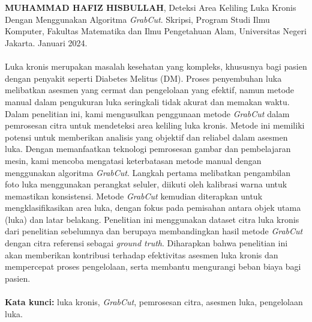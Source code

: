 \chapter*{}
\singlespacing{}

\textbf{MUHAMMAD HAFIZ HISBULLAH}, Deteksi Area Keliling Luka Kronis Dengan 
Menggunakan Algoritma \emph{GrabCut}. Skripsi, Program Studi Ilmu Komputer, Fakultas Matematika dan Ilmu Pengetahuan Alam, Universitas Negeri Jakarta. Januari 2024.
\\
\\

Luka kronis merupakan masalah kesehatan yang kompleks, khususnya bagi pasien dengan 
penyakit seperti Diabetes Melitus (DM). Proses penyembuhan luka melibatkan asesmen 
yang cermat dan pengelolaan yang efektif, namun metode manual dalam pengukuran 
luka seringkali tidak akurat dan memakan waktu. Dalam penelitian ini, kami mengusulkan 
penggunaan metode \emph{GrabCut} dalam pemrosesan citra untuk mendeteksi area keliling 
luka kronis. Metode ini memiliki potensi untuk memberikan analisis yang objektif 
dan reliabel dalam asesmen luka. Dengan memanfaatkan teknologi pemrosesan gambar dan pembelajaran mesin, kami mencoba 
mengatasi keterbatasan metode manual dengan menggunakan algoritma \emph{GrabCut}. Langkah 
pertama melibatkan pengambilan foto luka menggunakan perangkat seluler, diikuti 
oleh kalibrasi warna untuk memastikan konsistensi. Metode \emph{GrabCut} kemudian diterapkan 
untuk mengklasifikasikan area luka, dengan fokus pada pemisahan antara objek utama 
(luka) dan latar belakang. Penelitian ini menggunakan dataset citra luka kronis dari penelitian sebelumnya 
dan berupaya membandingkan hasil metode \emph{GrabCut} dengan citra referensi sebagai 
\emph{ground truth}. Diharapkan bahwa penelitian ini akan memberikan kontribusi 
terhadap efektivitas asesmen luka kronis dan mempercepat proses pengelolaan, serta 
membantu mengurangi beban biaya bagi pasien.
\\
\\
\textbf{Kata kunci:} luka kronis, \emph{GrabCut}, pemrosesan citra, asesmen luka, pengelolaan luka.
